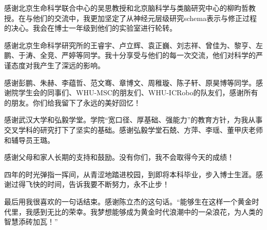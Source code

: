 \begin{acknowledgements}
  感谢北京生命科学联合中心的吴思教授和北京脑科学与类脑研究中心的柳昀哲教授。在与他们的交流中，我更加坚定了从神经元层级研究schema表示与修正过程的决心。我会在博士一年级到他们的实验室进行轮转。

  感谢北京生命科学研究所的王睿宇、卢立辉、袁正巍、刘志祥、曾佳为、黎亨、左鹏、于涛、全竞、严婷等同学。我十分享受与他们的每一次交流，他们对科学的严谨态度对我产生了深远的影响。

  感谢彭鹏、朱赫、李蕴哲、范文骞、章博文、周稚璇、陈子轩、原昊博等同学。感谢院学生会的同事们、WHU-MSC的朋友们、WHU-ICRobo的队友们，感谢所有的朋友。你们给我留下了永远的美好回忆！

  感谢武汉大学和弘毅学堂。学院“宽口径、厚基础、强能力”的教育方针，为我从事交叉学科的研究打下了坚实的基础。感谢弘毅学堂石兢、方萍、李瑶、董甲庆老师和辅导员王璐。

  感谢父母和家人长期的支持和鼓励。没有你们，我不会取得今天的成绩！

  四年的时光弹指一挥间，从青涩地踏进校园，到即将本科毕业，步入博士生涯。感谢过得飞快的时间，告诉我要不断努力，永不止步！

  最后用我很喜欢的一句话结束。感谢陈立杰的这句话。“能够生在这样一个黄金时代里，我感到无比的荣幸。我梦想能够成为黄金时代浪潮中的一朵浪花，为人类的智慧添砖加瓦！”
\end{acknowledgements}

